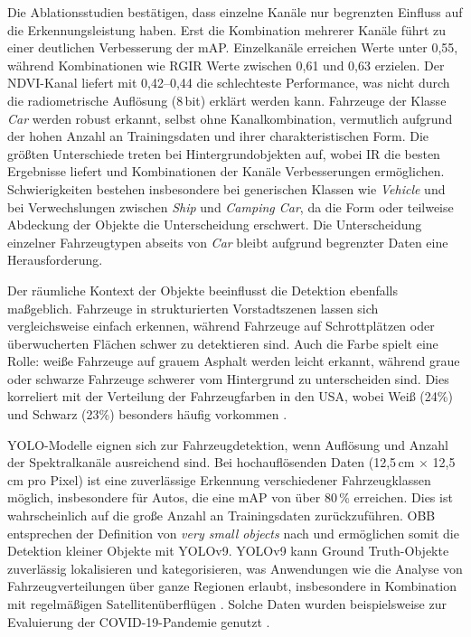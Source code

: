 Die Ablationsstudien bestätigen, dass einzelne Kanäle nur begrenzten Einfluss auf die Erkennungsleistung haben. Erst die Kombination mehrerer Kanäle führt zu einer deutlichen Verbesserung der mAP. Einzelkanäle erreichen Werte unter 0,55, während Kombinationen wie  RGIR Werte zwischen 0,61 und 0,63 erzielen. Der NDVI-Kanal liefert mit 0,42–0,44 die schlechteste Performance, was nicht durch die radiometrische Auflösung (8\,bit) erklärt werden kann. Fahrzeuge der Klasse \emph{Car} werden robust erkannt, selbst ohne Kanalkombination, vermutlich aufgrund der hohen Anzahl an Trainingsdaten und ihrer charakteristischen Form. Die größten Unterschiede treten bei Hintergrundobjekten auf, wobei IR die besten Ergebnisse liefert und Kombinationen der Kanäle Verbesserungen ermöglichen. Schwierigkeiten bestehen insbesondere bei generischen Klassen wie \emph{Vehicle} und bei Verwechslungen zwischen \emph{Ship} und \emph{Camping Car}, da die Form oder teilweise Abdeckung der Objekte die Unterscheidung erschwert. Die Unterscheidung einzelner Fahrzeugtypen abseits von \emph{Car} bleibt aufgrund begrenzter Daten eine Herausforderung.

Der räumliche Kontext der Objekte beeinflusst die Detektion ebenfalls maßgeblich. Fahrzeuge in strukturierten Vorstadtszenen lassen sich vergleichsweise einfach erkennen, während Fahrzeuge auf Schrottplätzen oder überwucherten Flächen schwer zu detektieren sind. Auch die Farbe spielt eine Rolle: weiße Fahrzeuge auf grauem Asphalt werden leicht erkannt, während graue oder schwarze Fahrzeuge schwerer vom Hintergrund zu unterscheiden sind. Dies korreliert mit der Verteilung der Fahrzeugfarben in den USA, wobei Weiß (24\%) und Schwarz (23\%) besonders häufig vorkommen \cite{abc_utah}.

YOLO-Modelle  eignen sich zur Fahrzeugdetektion, wenn Auflösung und Anzahl der Spektralkanäle ausreichend sind. Bei hochauflösenden Daten (12,5\,cm $\times$ 12,5\,cm pro Pixel) ist eine zuverlässige Erkennung verschiedener Fahrzeugklassen möglich, insbesondere für Autos, die eine mAP von über 80\,\% erreichen. Dies ist wahrscheinlich auf die große Anzahl an Trainingsdaten zurückzuführen. OBB entsprechen der Definition von \emph{very small objects} nach \cite{Chen2017} und ermöglichen somit die Detektion kleiner Objekte mit YOLOv9.  YOLOv9 kann Ground Truth-Objekte zuverlässig lokalisieren und kategorisieren, was Anwendungen wie die Analyse von Fahrzeugverteilungen über ganze Regionen erlaubt, insbesondere in Kombination mit regelmäßigen Satellitenüberflügen \cite{planet_labs, airbus_neo}.  Solche Daten wurden beispielsweise zur Evaluierung der COVID-19-Pandemie genutzt \cite{Spiegel_article}.

